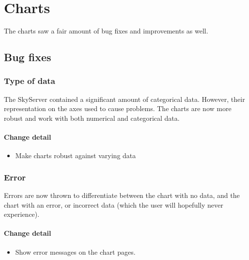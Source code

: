 \section{Charts}
The charts saw a fair amount of bug fixes and improvements as well.


\subsection{Bug fixes}
  \subsubsection{Type of data}
  The SkyServer contained a significant amount of categorical data. However, their representation on the axes
  used to cause problems. The charts are now more robust and work with both numerical and categorical data.
  
 \paragraph{Change detail}
\begin{itemize}
  \item Make charts robust against varying data
\end{itemize}
  
 \subsubsection{Error}
  Errors are now thrown to differentiate between the chart with no data, and the chart with an error,
  or incorrect data (which the user will hopefully never experience). 
  
   \paragraph{Change detail}
\begin{itemize}
  \item Show error messages on the chart pages.
\end{itemize}
  
